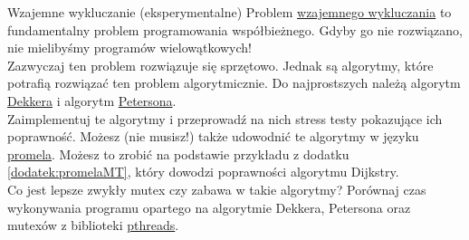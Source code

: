 \begin{exercise}{Wzajemne wykluczanie (eksperymentalne)}{}
Problem \href{https://en.wikipedia.org/wiki/Mutual_exclusion}{wzajemnego wykluczania} to fundamentalny problem programowania współbieżnego. Gdyby go nie rozwiązano, nie mielibyśmy programów wielowątkowych! \\

Zazwyczaj ten problem rozwiązuje się sprzętowo. Jednak są algorytmy, które potrafią rozwiązać ten problem algorytmicznie.
Do najprostszych należą algorytm \href{https://en.wikipedia.org/wiki/Dekker\%27s_algorithm}{Dekkera} i algorytm \href{https://en.wikipedia.org/wiki/Peterson\%27s_algorithm}{Petersona}. \\

Zaimplementuj te algorytmy i przeprowadź na nich stress testy pokazujące ich poprawność. Możesz (nie musisz!) także udowodnić te algorytmy w języku \href{http://spinroot.com/spin/Man/promela.html}{promela}. Możesz to zrobić na podstawie przykładu z dodatku \ref{dodatek:promelaMT}, który dowodzi poprawności algorytmu Dijkstry. \\

Co jest lepsze zwykły mutex czy zabawa w takie algorytmy? Porównaj czas wykonywania programu opartego na algorytmie Dekkera, Petersona oraz mutexów z biblioteki \href{https://pubs.opengroup.org/onlinepubs/7908799/xsh/pthread.h.html}{pthreads}.
\end{exercise}

\clearpage

